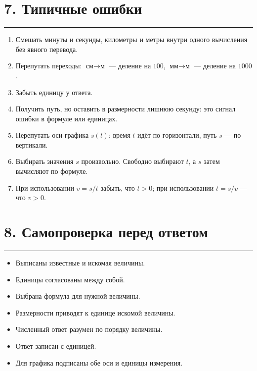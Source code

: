 \documentclass[a4paper,12pt]{article}
\newcommand{\sectionline}{%
  \par\vspace{0.15em}%
  \noindent\textcolor{lightaccent}{\rule{\linewidth}{0.7pt}}%
  \par\vspace{0.35em}%
}
\begin{document}
\clearpage

\section*{7. Типичные ошибки}
\sectionline

\begin{enumerate}

  \item
  Смешать минуты и секунды,
  километры и метры
  внутри одного вычисления
  без явного перевода.

  \item
  Перепутать переходы:
  $\text{см}\to\text{м}$ --- деление на $100$,
  $\text{мм}\to\text{м}$ --- деление на $1000$.

  \item
  Забыть единицу у ответа.

  \item
  Получить путь,
  но оставить в размерности лишнюю секунду:
  это сигнал ошибки в формуле или единицах.

  \item
  Перепутать оси графика $s(t)$:
  время $t$ идёт по горизонтали,
  путь $s$ --- по вертикали.

  \item
  Выбирать значения $s$ произвольно.
  Свободно выбирают $t$,
  а $s$ затем вычисляют по формуле.

  \item
  При использовании
  $v=s/t$
  забыть,
  что $t>0$;
  при использовании
  $t=s/v$ ---
  что $v>0$.

\end{enumerate}

\section*{8. Самопроверка перед ответом}
\sectionline

\begin{itemize}[label={$\square$}]

  \item
  Выписаны известные и искомая величины.

  \item
  Единицы согласованы между собой.

  \item
  Выбрана формула для нужной величины.

  \item
  Размерности приводят к единице искомой величины.

  \item
  Численный ответ разумен по порядку величины.

  \item
  Ответ записан с единицей.

  \item
  Для графика подписаны обе оси и единицы измерения.

\end{itemize}
\end{document}
